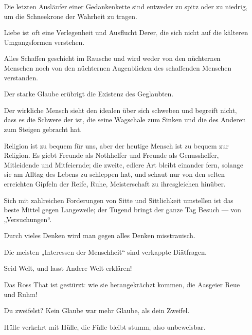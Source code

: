 Die letzten Ausläufer einer Gedankenkette sind entweder zu spitz oder zu niedrig, um die Schneekrone der Wahrheit zu tragen.
\par

Liebe ist oft eine Verlegenheit und Ausflucht Derer, die sich nicht auf die kälteren Umgangsformen verstehen.
\par

Alles Schaffen geschieht im Rausche und wird weder von den nüchternen Menschen noch von den nüchternen Augenblicken des schaffenden Menschen verstanden.
\par

Der starke Glaube erübrigt die Existenz des Geglaubten.
\par

Der wirkliche Mensch sieht den idealen über sich schweben und begreift nicht, dass es die Schwere der  ist, die seine Wagschale zum Sinken und die des Anderen zum Steigen gebracht hat.
\par

Religion ist zu bequem für uns, aber der heutige Mensch ist zu bequem zur Religion. Es giebt Freunde als Nothhelfer und Freunde als Genusshelfer, Mitleidende und Mitfeiernde; die zweite, edlere Art bleibt einander fern, solange sie am Alltag des Lebens zu schleppen hat, und schaut nur von den selten erreichten Gipfeln der Reife, Ruhe, Meisterschaft zu ihresgleichen hinüber.
\par

Sich mit zahlreichen Forderungen von Sitte und Sittlichkeit umstellen ist das beste Mittel gegen Langeweile; der Tugend bringt der ganze Tag Besuch — von „Versuchungen“.
\par

Durch vieles Denken wird man gegen alles Denken misstrauisch.
\par

Die meisten „Interessen der Menschheit“ sind verkappte Diätfragen.
\par

Seid Welt, und lasst Andere Welt erklären!
\par

Das Ross That ist gestürzt: wie sie herangekrächzt kommen, die Aasgeier Reue und Ruhm!
\par

Du zweifelst? Kein Glaube war mehr Glaube, als dein Zweifel.
\par

Hülle verkehrt mit Hülle, die Fülle bleibt stumm, also unbeweisbar.
\par

